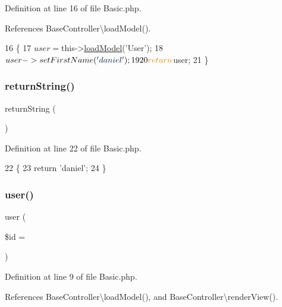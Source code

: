 Definition at line 16 of file Basic.\+php.



References Base\+Controller\textbackslash{}load\+Model().


\begin{DoxyCode}
16                                   \{
17         $user = $this->\hyperlink{class_base_controller_a5fa8890bd3a9d20f5c0cc2377dc49eb1}{loadModel}(\textcolor{stringliteral}{'User'});
18         $user->setFirstName(\textcolor{stringliteral}{'daniel'});
19 
20         \textcolor{keywordflow}{return} $user;
21     \}
\end{DoxyCode}
\hypertarget{class_basic_a5bb666dcea19a9561c2047cfa25936bd}{}\label{class_basic_a5bb666dcea19a9561c2047cfa25936bd} 
\subsubsection{\texorpdfstring{return\+String()}{returnString()}}
{\footnotesize\ttfamily return\+String (\begin{DoxyParamCaption}{ }\end{DoxyParamCaption})}



Definition at line 22 of file Basic.\+php.


\begin{DoxyCode}
22                                    \{
23         \textcolor{keywordflow}{return} \textcolor{stringliteral}{'daniel'};
24     \}
\end{DoxyCode}
\hypertarget{class_basic_a6603546e99f9519b86989be128736ad6}{}\label{class_basic_a6603546e99f9519b86989be128736ad6} 
\subsubsection{\texorpdfstring{user()}{user()}}
{\footnotesize\ttfamily user (\begin{DoxyParamCaption}\item[{}]{\$id = {\ttfamily \textquotesingle{}\textquotesingle{}} }\end{DoxyParamCaption})}



Definition at line 9 of file Basic.\+php.



References Base\+Controller\textbackslash{}load\+Model(), and Base\+Controller\textbackslash{}render\+View().


